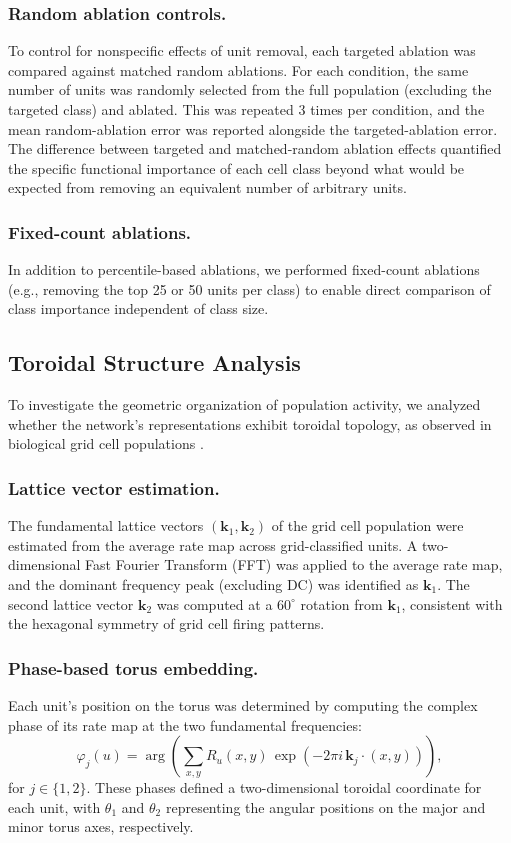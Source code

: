\documentclass[11pt]{article}
\begin{document}
\subsubsection*{Random ablation controls.}
To control for nonspecific effects of unit removal, each targeted ablation was compared against matched random ablations. For each condition, the same number of units was randomly selected from the full population (excluding the targeted class) and ablated. This was repeated 3 times per condition, and the mean random-ablation error was reported alongside the targeted-ablation error. The difference between targeted and matched-random ablation effects quantified the specific functional importance of each cell class beyond what would be expected from removing an equivalent number of arbitrary units.

\subsubsection*{Fixed-count ablations.}
In addition to percentile-based ablations, we performed fixed-count ablations (e.g., removing the top 25 or 50 units per class) to enable direct comparison of class importance independent of class size.


\subsection*{Toroidal Structure Analysis}

To investigate the geometric organization of population activity, we analyzed whether the network's representations exhibit toroidal topology, as observed in biological grid cell populations \cite{gardner2022}.

\subsubsection*{Lattice vector estimation.}
The fundamental lattice vectors $(\mathbf{k}_1, \mathbf{k}_2)$ of the grid cell population were estimated from the average rate map across grid-classified units. A two-dimensional Fast Fourier Transform (FFT) was applied to the average rate map, and the dominant frequency peak (excluding DC) was identified as $\mathbf{k}_1$. The second lattice vector $\mathbf{k}_2$ was computed at a $60^\circ$ rotation from $\mathbf{k}_1$, consistent with the hexagonal symmetry of grid cell firing patterns.

\subsubsection*{Phase-based torus embedding.}
Each unit's position on the torus was determined by computing the complex phase of its rate map at the two fundamental frequencies:
\begin{equation}
    \varphi_j(u) = \arg\!\left(\sum_{x,y} R_u(x,y)\,\exp\!\left(-2\pi i\,\mathbf{k}_j \cdot (x, y)\right)\right),
\end{equation}
for $j \in \{1, 2\}$. These phases defined a two-dimensional toroidal coordinate for each unit, with $\theta_1$ and $\theta_2$ representing the angular positions on the major and minor torus axes, respectively.
\end{document}
